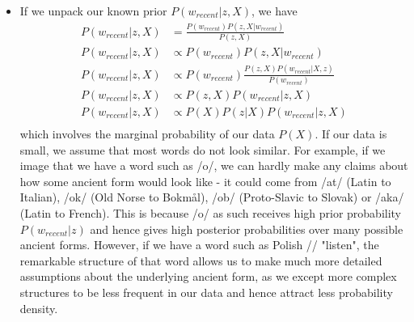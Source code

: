 \documentclass[6pt]{article}
\begin{document}
\begin{itemize}
\item  If we unpack our known prior $P(w_{recent}|z,X)$, we have
\begin{equation}
\begin{split}
P(w_{recent}|z,X)  & = \frac{P(w_{recent})P(z,X|w_{recent})}{P(z,X)} \\
P(w_{recent}|z,X) & \propto P(w_{recent})P(z,X|w_{recent})\\
P(w_{recent}|z,X) & \propto P(w_{recent})\frac{P(z,X)P(w_{recent}|X,z)}{P(w_{recent})}\\
P(w_{recent}|z,X) & \propto P(z,X)P(w_{recent}|z,X)\\
P(w_{recent}|z,X) & \propto P(X)P(z|X)P(w_{recent}|z,X)\\
\end{split}
\end{equation}
which involves the marginal probability of our data $P(X)$. If our data is small,  we assume that most words do not look similar. 
For example, if we image that we have a word such as  /o/, we can hardly make any claims about how some ancient form would look like - it could come from /at/ (Latin to Italian), /ok/ (Old Norse to Bokm\r{a}l), /ob/ (Proto-Slavic to Slovak) or /aka/ (Latin to French). This is because /o/ as such receives high prior probability $P(w_{recent}|z)$ and hence gives high posterior probabilities over many possible ancient forms. However, if we have a word such as Polish // "listen", the remarkable structure of that word allows us to make much more detailed assumptions about the underlying ancient form, as we except more complex structures to be less frequent in our data and hence attract less probability density. 

\end{itemize}




\end{document}
